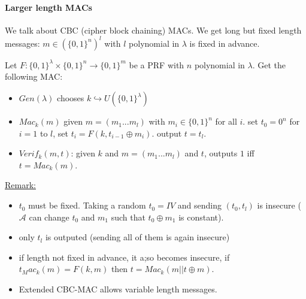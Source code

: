 \documentclass{article}
\newcommand{\Rem}{\underline{Remark:} }
\newcommand{\A}{\mathcal{A}}
\newcommand{\bit}{\{0,1\}}
\begin{document}
\paragraph{Larger length MACs} We talk about CBC (cipher block chaining) MACs. We get long but fixed length messages: $m\in(\bit^n)^l$ with $l$ polynomial in $\lambda$ is fixed in advance.

Let $F:\bit^\lambda\times\bit^n\rightarrow\bit^m$ be a PRF with $n$ polynomial in $\lambda$. Get the following MAC:\begin{itemize}
\item $Gen(\lambda)$ chooses $k\hookrightarrow U(\bit^\lambda)$
\item $Mac_k(m)$ given $m=(m_1...m_l)$ with $m_i\in\bit^n$ for all $i$.
\subitem set $t_0=0^n$
\subitem for $i=1$ to $l$, set $t_i=F(k,t_{i-1}\oplus m_i)$.
\subitem output $t=t_l$.
\item $Verif_k(m,t)$: given $k$ and $m=(m_1...m_l)$ and $t$, outputs $1$ iff $t=Mac_k(m)$.
\end{itemize} 

\Rem \begin{itemize}
\item $t_0$ must be fixed. Taking a random $t_0=IV$ and sending $(t_0,t_l)$ is insecure ($\A$ can change $t_0$ and $m_1$ such that $t_0\oplus m_1$ is constant). 
\item only $t_l$ is outputed (sending all of them is again insecure)
\item if length not fixed in advance, it a;so becomes insecure, if $t_Mac_k(m)=F(k,m)$ then $t=Mac_k(m||t\oplus m)$. 
\item Extended CBC-MAC allows variable length messages.
\end{itemize}
\end{document}
